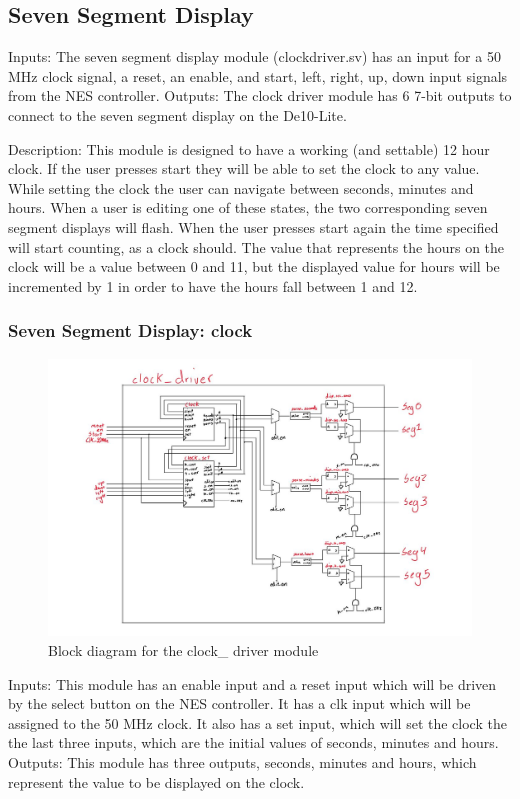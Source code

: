 \documentclass[a4paper]{article}
\begin{document}
\subsection{Seven Segment Display}
Inputs: The seven segment display module (clockdriver.sv) has an input for a 50 MHz clock signal, a reset, an enable, and start, left, right, up, down input signals from the NES controller.
Outputs: The clock driver module has 6 7-bit outputs to connect to the seven segment display on the De10-Lite.

Description: This module is designed to have a working (and settable) 12 hour clock. If the user presses start they will be able to set the clock to any value. While setting the clock the user can navigate between seconds, minutes and hours. When a user is editing one of these states, the two corresponding seven segment displays will flash. When the user presses start again the time specified will start counting, as a clock should. The value that represents the hours on the clock will be a value between 0 and 11, but the displayed value for hours will be incremented by 1 in order to have the hours fall between 1 and 12.

\subsubsection{Seven Segment Display: clock}
\begin{figure}[H]
    \includegraphics[width=0.8 \linewidth]{images/clockdriver.JPG}
    \caption{Block diagram for the clock\_ driver module}
    \label{clockdriver}
\end{figure}

Inputs: This module has an enable input and a reset input which will be driven by the select button on the NES controller. It has a clk input which will be assigned to the 50 MHz clock. It also has a set input, which will set the clock the the last three inputs, which are the initial values of seconds, minutes and hours.
Outputs: This module has three outputs, seconds, minutes and hours, which represent the value to be displayed on the clock.
\end{document}
